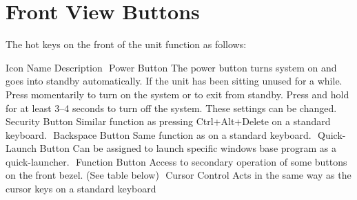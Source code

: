 \section[front-view-buttons]{Front View Buttons}

The hot keys on the front of the unit function as follows:

\startplacetable[title={Front view buttons}]
\startxtable
\startxtablehead
\startxrow[head]
\startxcell[align=center]
​Icon
\stopxcell
\startxcell
Name
\stopxcell
\startxcell
Description
\stopxcell
\stopxrow
\stopxtablehead
\startxtablebody
\startxrow[body]
\startxcell[align=center]
​{}
\stopxcell
\startxcell
Power Button
\stopxcell
\startxcell
The power button turns system on and goes into standby automatically. If the unit has been sitting unused for a while. Press momentarily to turn on the system or to exit from standby. Press and hold for at least 3–4 seconds to turn off the system. These settings can be changed.
\stopxcell
\stopxrow
\startxrow[body]
\startxcell[align=center]
​{}
\stopxcell
\startxcell
Security Button
\stopxcell
\startxcell
Similar function as pressing Ctrl+Alt+Delete on a standard keyboard.
\stopxcell
\stopxrow
\startxrow[body]
\startxcell[align=center]
​{}
\stopxcell
\startxcell
Backspace Button
\stopxcell
\startxcell
Same function as on a standard keyboard.
\stopxcell
\stopxrow
\startxrow[body]
\startxcell[align=center]
​{}
\stopxcell
\startxcell
Quick-Launch Button
\stopxcell
\startxcell
Can be assigned to launch specific windows base program as a quick-launcher.
\stopxcell
\stopxrow
\startxrow[body]
\startxcell[align=center]
​{}
\stopxcell
\startxcell
Function Button
\stopxcell
\startxcell
Access to secondary operation of some buttons on the front bezel. (See table below)
\stopxcell
\stopxrow
\startxrow[body]
\startxcell[align=center]
​{}
\stopxcell
\startxcell
Cursor Control
\stopxcell
\startxcell
Acts in the same way as the cursor keys on a standard keyboard
\stopxcell
\stopxrow
\startxrow[body]
